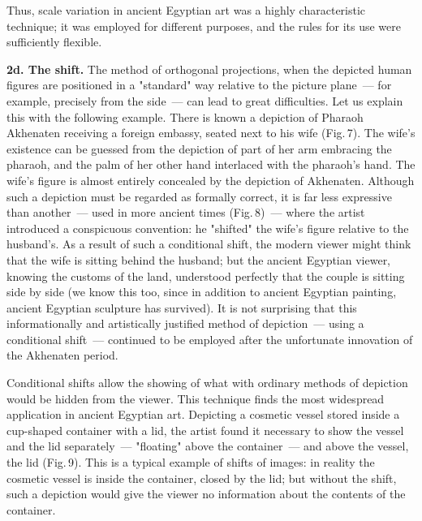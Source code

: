 
Thus, scale variation in ancient Egyptian art was a highly characteristic technique; it
was employed for different purposes, and the rules for its use were sufficiently flexible.

\medskip

\noindent\textbf{2d. The shift.} The method of orthogonal projections, when the depicted
human figures are positioned in a "standard" way relative to the picture plane~--- for
example, precisely from the side~--- can lead to great difficulties. Let us explain this
with the following example. There is known a depiction of Pharaoh Akhenaten receiving
a foreign embassy, seated next to his wife (Fig.\,7). The wife's existence can be guessed
from the depiction of part of her arm embracing the pharaoh, and the palm of her other
hand interlaced with the pharaoh's hand. The wife's figure is almost entirely concealed
by the depiction of Akhenaten. Although such a depiction must be regarded as formally
correct, it is far less expressive than another~--- used in more ancient times (Fig.\,8)~---
where the artist introduced a conspicuous convention: he "shifted" the wife's figure
relative to the husband's. As a result of such a conditional shift, the modern viewer
might think that the wife is sitting behind the husband; but the ancient Egyptian viewer,
knowing the customs of the land, understood perfectly that the couple is sitting side by
side (we know this too, since in addition to ancient Egyptian painting, ancient Egyptian
sculpture has survived). It is not surprising that this informationally and artistically
justified method of depiction~--- using a conditional shift~--- continued to be employed after
the unfortunate innovation of the Akhenaten period.




Conditional shifts allow the showing of what with ordinary methods of depiction would
be hidden from the viewer. This technique finds the most widespread application in
ancient Egyptian art. Depicting a cosmetic vessel stored inside a cup-shaped container
with a lid, the artist found it necessary to show the vessel and the lid separately~---
"floating" above the container~--- and above the vessel, the lid (Fig.\,9). This is a
typical example of shifts of images: in reality the cosmetic vessel is inside the container,
closed by the lid; but without the shift, such a depiction would give the viewer no
information about the contents of the container.


